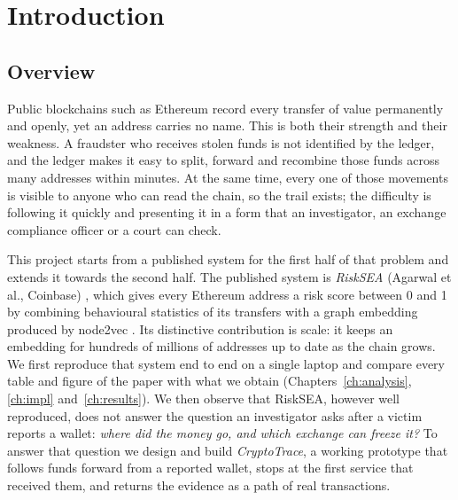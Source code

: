 \chapter{Introduction}
\label{ch:intro}

\section{Overview}
Public blockchains such as Ethereum record every transfer of value permanently and openly, yet an address carries no name. This is both their strength and their weakness. A fraudster who receives stolen funds is not identified by the ledger, and the ledger makes it easy to split, forward and recombine those funds across many addresses within minutes. At the same time, every one of those movements is visible to anyone who can read the chain, so the trail exists; the difficulty is following it quickly and presenting it in a form that an investigator, an exchange compliance officer or a court can check.

This project starts from a published system for the first half of that problem and extends it towards the second half. The published system is \emph{RiskSEA} (Agarwal et al., Coinbase) \cite{risksea}, which gives every Ethereum address a risk score between 0 and 1 by combining behavioural statistics of its transfers with a graph embedding produced by node2vec \cite{node2vec}. Its distinctive contribution is scale: it keeps an embedding for hundreds of millions of addresses up to date as the chain grows. We first reproduce that system end to end on a single laptop and compare every table and figure of the paper with what we obtain (Chapters~\ref{ch:analysis}, \ref{ch:impl} and~\ref{ch:results}). We then observe that RiskSEA, however well reproduced, does not answer the question an investigator asks after a victim reports a wallet: \emph{where did the money go, and which exchange can freeze it?} To answer that question we design and build \emph{CryptoTrace}, a working prototype that follows funds forward from a reported wallet, stops at the first service that received them, and returns the evidence as a path of real transactions.

